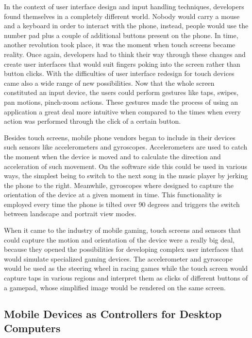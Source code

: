 In the context of user interface design and input handling techniques,
developers found themselves in a completely different world. Nobody would
carry a mouse and a keyboard in order to interact with the phone, instead,
people would use the number pad plus a couple of additional buttons present on
the phone. In time, another revolution took place, it was the moment when
touch screens became reality. Once again, developers had to think their way
through these changes and create user interfaces that would suit fingers
poking into the screen rather than button clicks. With the difficulties of
user interface redesign for touch devices came also a wide range of new
possibilities. Now that the whole screen constituted an input device, the
users could perform gestures like taps, swipes, pan motions, pinch-zoom
actions. These gestures made the process of using an application a great deal
more intuitive when compared to the times when every action was performed
through the click of a certain button.

Besides touch screens, mobile phone vendors began to include in their devices
such sensors like accelerometers and gyroscopes. Accelerometers are used to
catch the moment when the device is moved and to calculate the direction and
acceleration of such movement. On the software side this could be used in
various ways, the simplest being to switch to the next song in the music
player by jerking the phone to the right. Meanwhile, gyroscopes where designed
to capture the orientation of the device at a given moment in time. This
functionality is employed every time the phone is tilted over 90 degrees and
triggers the switch between landscape and portrait view modes.

When it came to the industry of mobile gaming, touch screens and sensors that
could capture the motion and orientation of the device were a really big deal,
because they opened the possibilities for developing complex user interfaces
that would simulate specialized gaming devices. The accelerometer and
gyroscope would be used as the steering wheel in racing games while the touch
screen would capture taps in various regions and interpret them as clicks of
different buttons of a gamepad, whose simplified image would be rendered on
the same screen.


\subsection{Mobile Devices as Controllers for Desktop Computers}

